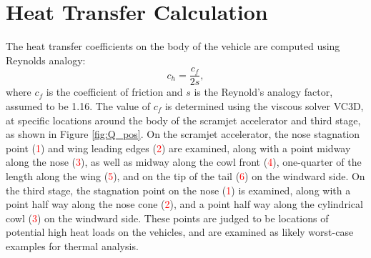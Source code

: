 \section{Heat Transfer Calculation}
The heat transfer coefficients on the body of the vehicle are computed using Reynolds analogy: 
\begin{equation}
c_h = \frac{c_f}{2s},
\end{equation}
where $c_f$ is the coefficient of friction and $s$ is the Reynold's analogy factor, assumed to be 1.16\cite{Ward2018}. 
The value of $c_f$ is determined using the viscous solver VC3D, at specific locations around the body of the scramjet accelerator and third stage, as shown in Figure \ref{fig:Q_pos}. On the scramjet accelerator, the nose stagnation point (\textcolor{red}{1}) and wing leading edges (\textcolor{red}{2}) are examined, along with a point midway along the nose (\textcolor{red}{3}), as well as midway along the cowl front (\textcolor{red}{4}), one-quarter of the length along the wing (\textcolor{red}{5}), and on the tip of the tail (\textcolor{red}{6}) on the windward side. On the third stage, the stagnation point on the nose (\textcolor{red}{1}) is examined, along with a point half way along the nose cone (\textcolor{red}{2}), and a point half way along the cylindrical cowl (\textcolor{red}{3}) on the windward side. These points are judged to be locations of potential high heat loads on the vehicles, and are examined as likely worst-case examples for thermal analysis. 

